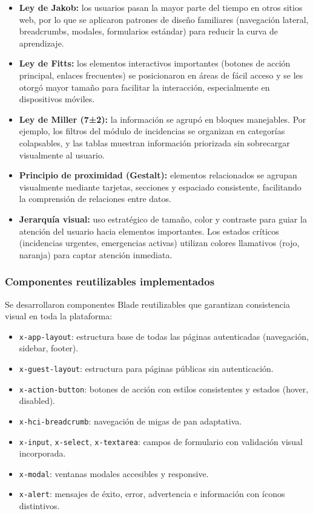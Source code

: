 \begin{itemize}
    \item \textbf{Ley de Jakob:} los usuarios pasan la mayor parte del tiempo en otros sitios web, por lo que se aplicaron patrones de diseño familiares (navegación lateral, breadcrumbs, modales, formularios estándar) para reducir la curva de aprendizaje.
    
    \item \textbf{Ley de Fitts:} los elementos interactivos importantes (botones de acción principal, enlaces frecuentes) se posicionaron en áreas de fácil acceso y se les otorgó mayor tamaño para facilitar la interacción, especialmente en dispositivos móviles.
    
    \item \textbf{Ley de Miller (7±2):} la información se agrupó en bloques manejables. Por ejemplo, los filtros del módulo de incidencias se organizan en categorías colapsables, y las tablas muestran información priorizada sin sobrecargar visualmente al usuario.
    
    \item \textbf{Principio de proximidad (Gestalt):} elementos relacionados se agrupan visualmente mediante tarjetas, secciones y espaciado consistente, facilitando la comprensión de relaciones entre datos.
    
    \item \textbf{Jerarquía visual:} uso estratégico de tamaño, color y contraste para guiar la atención del usuario hacia elementos importantes. Los estados críticos (incidencias urgentes, emergencias activas) utilizan colores llamativos (rojo, naranja) para captar atención inmediata.
\end{itemize}

\subsubsection{Componentes reutilizables implementados}

Se desarrollaron componentes Blade reutilizables que garantizan consistencia visual en toda la plataforma:

\begin{itemize}
    \item \texttt{x-app-layout}: estructura base de todas las páginas autenticadas (navegación, sidebar, footer).
    \item \texttt{x-guest-layout}: estructura para páginas públicas sin autenticación.
    \item \texttt{x-action-button}: botones de acción con estilos consistentes y estados (hover, disabled).
    \item \texttt{x-hci-breadcrumb}: navegación de migas de pan adaptativa.
    \item \texttt{x-input}, \texttt{x-select}, \texttt{x-textarea}: campos de formulario con validación visual incorporada.
    \item \texttt{x-modal}: ventanas modales accesibles y responsive.
    \item \texttt{x-alert}: mensajes de éxito, error, advertencia e información con íconos distintivos.
\end{itemize}

